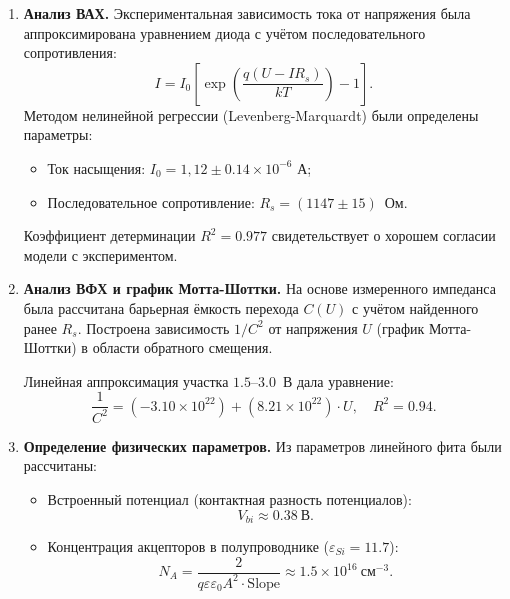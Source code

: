 \documentclass[a4paper,12pt]{article}
\begin{document}
\begin{enumerate}
    \item \textbf{Анализ ВАХ.} 
    Экспериментальная зависимость тока от напряжения была аппроксимирована уравнением диода с учётом последовательного сопротивления:
    \begin{equation}
        I = I_0 \left[ \exp\left(\frac{q(U - I R_s)}{k T}\right) - 1 \right].
    \end{equation}
    Методом нелинейной регрессии (Levenberg-Marquardt) были определены параметры:
    \begin{itemize}
        \item Ток насыщения: $I_0 = 1,12 \pm 0.14 \times 10^{-6}$ А;
        \item Последовательное сопротивление: $R_s = (1147 \pm 15)$~Ом.
    \end{itemize}
    Коэффициент детерминации $R^2 = 0.977$ свидетельствует о хорошем согласии модели с экспериментом.

    \item \textbf{Анализ ВФХ и график Мотта-Шоттки.}
    На основе измеренного импеданса была рассчитана барьерная ёмкость перехода $C(U)$ с учётом найденного ранее $R_s$. Построена зависимость $1/C^2$ от напряжения $U$ (график Мотта-Шоттки) в области обратного смещения.
    
    Линейная аппроксимация участка $1.5\text{--}3.0$~В дала уравнение:
    \begin{equation}
        \frac{1}{C^2} = (-3.10 \times 10^{22}) + (8.21 \times 10^{22}) \cdot U, \quad R^2 = 0.94.
    \end{equation}

    \item \textbf{Определение физических параметров.}
    Из параметров линейного фита были рассчитаны:
    \begin{itemize}
        \item Встроенный потенциал (контактная разность потенциалов):
        \begin{equation}
            V_{bi} \approx 0.38~\text{В}.
        \end{equation}
        \item Концентрация акцепторов в полупроводнике ($\varepsilon_{Si} = 11.7$):
        \begin{equation}
            N_A = \frac{2}{q \varepsilon \varepsilon_0 A^2 \cdot \text{Slope}} \approx 1.5 \times 10^{16}~\text{см}^{-3}.
        \end{equation}
    \end{itemize}
\end{enumerate}
\end{document}

